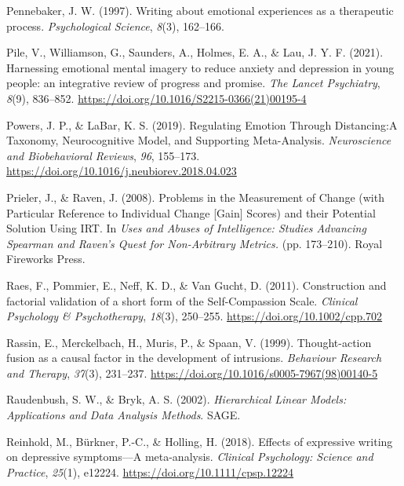 \documentclass[
  man,floatsintext]{apa7}
\newlength{\cslhangindent}
\newlength{\cslentryspacingunit} %
\newenvironment{CSLReferences}[2] %
 {%
  \setlength{\parindent}{0pt}
  \ifodd #1
  \let\oldpar\par
  \def\par{\hangindent=\cslhangindent\oldpar}
  \fi
  \setlength{\parskip}{#2\cslentryspacingunit}
 }%
 {}
\begin{document}
\begin{CSLReferences}{1}{0}
\leavevmode{}%
Pennebaker, J. W. (1997). Writing about emotional experiences as a therapeutic process. \emph{Psychological Science}, \emph{8}(3), 162--166.

\leavevmode{}%
Pile, V., Williamson, G., Saunders, A., Holmes, E. A., \& Lau, J. Y. F. (2021). Harnessing emotional mental imagery to reduce anxiety and depression in young people: an integrative review of progress and promise. \emph{The Lancet Psychiatry}, \emph{8}(9), 836--852. \url{https://doi.org/10.1016/S2215-0366(21)00195-4}

\leavevmode{}%
Powers, J. P., \& LaBar, K. S. (2019). Regulating Emotion Through Distancing:A Taxonomy, Neurocognitive Model, and Supporting Meta-Analysis. \emph{Neuroscience and Biobehavioral Reviews}, \emph{96}, 155--173. \url{https://doi.org/10.1016/j.neubiorev.2018.04.023}

\leavevmode{}%
Prieler, J., \& Raven, J. (2008). Problems in the Measurement of Change (with Particular Reference to Individual Change {[}Gain{]} Scores) and their Potential Solution Using IRT. In \emph{Uses and Abuses of Intelligence: Studies Advancing Spearman and Raven's Quest for Non-Arbitrary Metrics.} (pp. 173--210). Royal Fireworks Press.

\leavevmode{}%
Raes, F., Pommier, E., Neff, K. D., \& Van Gucht, D. (2011). Construction and factorial validation of a short form of the Self-Compassion Scale. \emph{Clinical Psychology \& Psychotherapy}, \emph{18}(3), 250--255. \url{https://doi.org/10.1002/cpp.702}

\leavevmode{}%
Rassin, E., Merckelbach, H., Muris, P., \& Spaan, V. (1999). Thought-action fusion as a causal factor in the development of intrusions. \emph{Behaviour Research and Therapy}, \emph{37}(3), 231--237. \url{https://doi.org/10.1016/s0005-7967(98)00140-5}

\leavevmode{}%
Raudenbush, S. W., \& Bryk, A. S. (2002). \emph{Hierarchical Linear Models: Applications and Data Analysis Methods}. SAGE.

\leavevmode{}%
Reinhold, M., Bürkner, P.-C., \& Holling, H. (2018). Effects of expressive writing on depressive symptoms---A meta-analysis. \emph{Clinical Psychology: Science and Practice}, \emph{25}(1), e12224. \url{https://doi.org/10.1111/cpsp.12224}


\end{CSLReferences}
\end{document}
